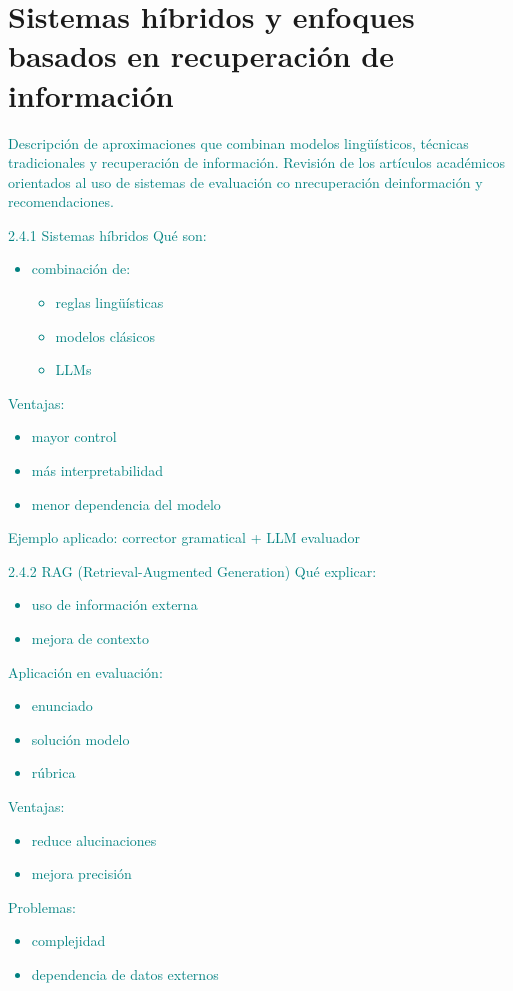 \section{Sistemas híbridos y enfoques basados en recuperación de información}
\textcolor{teal}{Descripción de aproximaciones que combinan modelos lingüísticos, técnicas tradicionales y recuperación de información. Revisión de los artículos académicos orientados al uso de sistemas de evaluación co nrecuperación deinformación y recomendaciones.}

\textcolor{teal}{
    2.4.1 Sistemas híbridos
    Qué son:
    \begin{itemize}
        \item combinación de:
        \begin{itemize}
            \item reglas lingüísticas
            \item modelos clásicos
            \item LLMs
        \end{itemize}        
    \end{itemize}
    Ventajas:
    \begin{itemize}
        \item mayor control
        \item más interpretabilidad
        \item menor dependencia del modelo
    \end{itemize}    
    Ejemplo aplicado: corrector gramatical + LLM evaluador
}

\textcolor{teal}{
    2.4.2 RAG (Retrieval-Augmented Generation)
    Qué explicar:
    \begin{itemize}
        \item uso de información externa
        \item mejora de contexto
    \end{itemize}
    Aplicación en evaluación:
    \begin{itemize}
        \item enunciado
        \item solución modelo
        \item rúbrica
    \end{itemize}
    Ventajas:
    \begin{itemize}
        \item reduce alucinaciones
        \item mejora precisión
    \end{itemize}
    Problemas:
    \begin{itemize}
        \item complejidad
        \item dependencia de datos externos
    \end{itemize}
}

